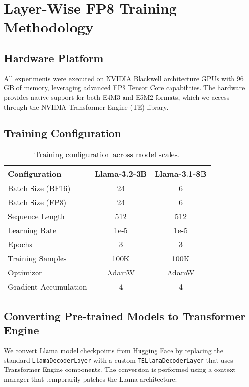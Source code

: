 \section{Layer-Wise FP8 Training Methodology}

\subsection{Hardware Platform}
All experiments were executed on NVIDIA Blackwell architecture GPUs with 96 GB of memory, leveraging advanced FP8 Tensor Core capabilities. The hardware provides native support for both E4M3 and E5M2 formats, which we access through the NVIDIA Transformer Engine (TE) library\cite{transformer_engine}.

\subsection{Training Configuration}
\vspace{-0.5em}
\begin{table}[htbp]
    \centering\small
    \begin{tabular}{lcc}
        \toprule
        \textbf{Configuration} & \textbf{Llama-3.2-3B} & \textbf{Llama-3.1-8B} \\
        \midrule
        Batch Size (BF16) & 24 & 6 \\
        Batch Size (FP8) & 24 & 6 \\
        Sequence Length & 512 & 512 \\
        Learning Rate & 1e-5 & 1e-5 \\
        Epochs & 3 & 3 \\
        Training Samples & 100K & 100K \\
        Optimizer & AdamW & AdamW \\
        Gradient Accumulation & 4 & 4 \\
        \bottomrule
    \end{tabular}
    \caption{Training configuration across model scales.}
    \label{tab:fp8_config}
\end{table}

\subsection{Converting Pre-trained Models to Transformer Engine}
We convert Llama model checkpoints from Hugging Face by replacing the standard \texttt{LlamaDecoderLayer} with a custom \texttt{TELlamaDecoderLayer} that uses Transformer Engine components. The conversion is performed using a context manager that temporarily patches the Llama architecture:

